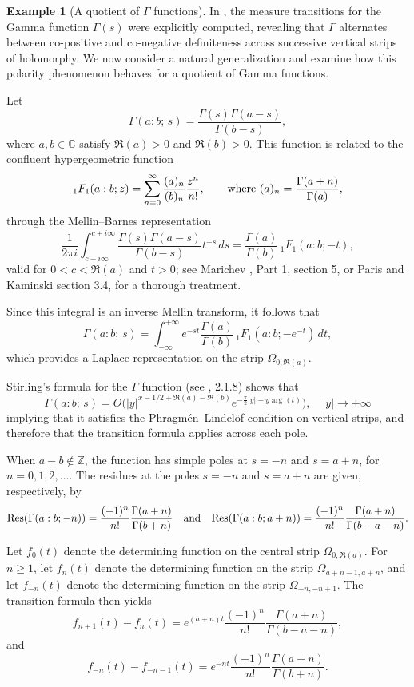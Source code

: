 \documentclass[12pt]{article}
\theoremstyle{definition}
\newtheorem{example}[theorem]{Example}
\begin{document}
\begin{example}[A quotient of $\Gamma$ functions]\label{ex:gamma}
In \cite{BuescuStrips, BuescuPolar, BuescuSpecial},   the measure transitions for the Gamma function  $\Gamma(s)$ 
were  explicitly computed, revealing that $\Gamma$ alternates between 
co-positive and co-negative definiteness across successive vertical strips of holomorphy.
We now consider a natural generalization and examine how this polarity phenomenon 
behaves for a quotient of Gamma functions.

Let 
\[
\Gamma(a:b;\,s)=\frac{\Gamma(s)\Gamma(a-s)}{\Gamma(b-s)},
\]
where $a,b\in\mathbb{C}$ satisfy $\Re(a)>0$ and $\Re(b)>0$.
This function is related to the confluent hypergeometric function
\[
{}_1F_1(a:b;z)=\sum_{n=0}^{\infty}\frac{(a)_n}{(b)_n}\frac{z^n}{n!}, 
\qquad {\rm where } \ 
(a)_n=\frac{\Gamma(a+n)}{\Gamma(a)},
\]
through the Mellin--Barnes representation
\[
\frac{1}{2\pi i} 
\int_{c-i\infty}^{c+i\infty}
\frac{\Gamma(s)\Gamma(a-s)}{\Gamma(b-s)}
t^{-s}\,ds
=
\frac{\Gamma(a)}{\Gamma(b)}
\,{}_1F_1(a:b;-t),
\]
valid for $0<c<\Re(a)$ and $t>0$; 
see Marichev \cite{Marichev}, Part 1, section 5, or Paris and Kaminski \cite{Paris} section 3.4, for a thorough  treatment.


Since this integral is an inverse Mellin transform, it follows that
\[
\Gamma(a:b;\,s)
=
\int_{-\infty}^{+\infty}
e^{-st}
\frac{\Gamma(a)}{\Gamma(b)}
\,{}_1F_1(a:b;-e^{-t})
\,dt,
\]
which provides a Laplace representation on the strip $\Omega_{0, \Re(a)}$.

Stirling’s formula for the $\Gamma$ function (see  \cite{Paris}, 2.1.8) shows that \[ \Gamma(a:b;\,s)=O \bigg(|y|^{x-1/2+ \Re(a)-\Re(b)}e^{-\frac{\pi}{2}|y|-y \arg(t)} \bigg), \quad |y| \to + \infty \] implying that it satisfies the 
Phragmén--Lindelöf condition on vertical strips, and therefore that the transition formula applies across each pole.

When $a-b\notin\mathbb{Z}$, the function has simple poles at 
$s=-n$ and $s=a+n$, for $n=0,1,2,\dots$. 
The residues at the poles $s=-n$ and $s=a+n$ are given, respectively, by
\[
{\rm Res}(\Gamma(a : b; -n))=\frac{(-1)^n} {n!}\frac{\Gamma(a+n)}{\Gamma(b+n)}
\quad \text{and} \quad {\rm Res}(\Gamma(a : b; a+n))=
\frac{(-1)^n}{n!}\frac{\Gamma(a+n)}{\Gamma(b-a-n)}.
\]

Let $f_0(t)$ denote the determining function on the central strip $\Omega_{0,\Re(a)}$. 
For $n\ge1$, let $f_n(t)$ denote the determining function on the strip 
$\Omega_{a+n-1,a+n}$, 
and let $f_{-n}(t)$ denote the determining function on the strip 
$\Omega_{-n,-n+1}$.
 The transition formula then yields
\[
f_{n+1}(t)-f_n(t)
=
e^{(a+n)t}
\frac{(-1)^n}{n!}
\frac{\Gamma(a+n)}{\Gamma(b-a-n)},
\]
and
\begin{equation}\label{eq:confluenttrans}
f_{-n}(t)-f_{-n-1}(t)
=
e^{-nt}
\frac{(-1)^n}{n!}
\frac{\Gamma(a+n)}{\Gamma(b+n)}.
\end{equation}


\end{example}
\end{document}
